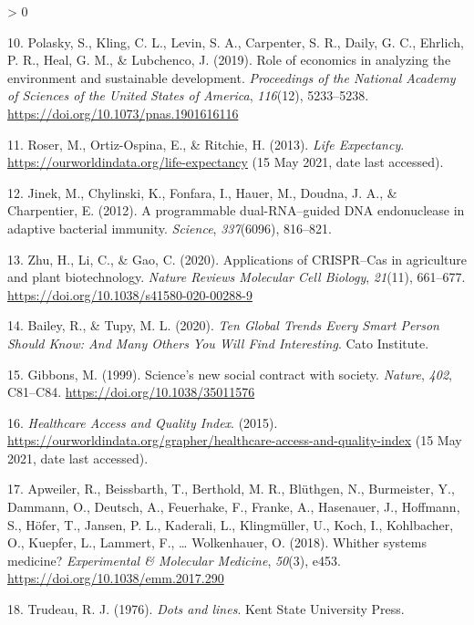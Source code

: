 \documentclass[
  12pt,
]{book}
\newlength{\cslhangindent}
\newenvironment{CSLReferences}[2] %
 {%
  \setlength{\parindent}{0pt}
  \ifodd #1 \everypar{\setlength{\hangindent}{\cslhangindent}}\ignorespaces\fi
  \ifnum #2 > 0
  \setlength{\parskip}{#2\baselineskip}
  \fi
 }%
 {}
\begin{document}
\begin{CSLReferences}{1}{0}
\leavevmode\hypertarget{ref-Polasky2019}{}%
10. Polasky, S., Kling, C. L., Levin, S. A., Carpenter, S. R., Daily, G. C., Ehrlich, P. R., Heal, G. M., \& Lubchenco, J. (2019). {Role of economics in analyzing the environment and sustainable development}. \emph{Proceedings of the National Academy of Sciences of the United States of America}, \emph{116}(12), 5233--5238. \url{https://doi.org/10.1073/pnas.1901616116}

\leavevmode\hypertarget{ref-Roser2013}{}%
11. Roser, M., Ortiz-Ospina, E., \& Ritchie, H. (2013). \emph{{Life Expectancy}}. \url{https://ourworldindata.org/life-expectancy} (15 May 2021, date last accessed).

\leavevmode\hypertarget{ref-Jinek2012}{}%
12. Jinek, M., Chylinski, K., Fonfara, I., Hauer, M., Doudna, J. A., \& Charpentier, E. (2012). {A programmable dual-RNA--guided DNA endonuclease in adaptive bacterial immunity}. \emph{Science}, \emph{337}(6096), 816--821.

\leavevmode\hypertarget{ref-Zhu2020}{}%
13. Zhu, H., Li, C., \& Gao, C. (2020). {Applications of CRISPR--Cas in agriculture and plant biotechnology}. \emph{Nature Reviews Molecular Cell Biology}, \emph{21}(11), 661--677. \url{https://doi.org/10.1038/s41580-020-00288-9}

\leavevmode\hypertarget{ref-Bailey2020}{}%
14. Bailey, R., \& Tupy, M. L. (2020). \emph{{Ten Global Trends Every Smart Person Should Know: And Many Others You Will Find Interesting}}. Cato Institute.

\leavevmode\hypertarget{ref-Gibbons1999}{}%
15. Gibbons, M. (1999). {Science's new social contract with society}. \emph{Nature}, \emph{402}, C81--C84. \url{https://doi.org/10.1038/35011576}

\leavevmode\hypertarget{ref-HAQ2015}{}%
16. \emph{{Healthcare Access and Quality Index}}. (2015). \url{https://ourworldindata.org/grapher/healthcare-access-and-quality-index} (15 May 2021, date last accessed).

\leavevmode\hypertarget{ref-Apweiler2018}{}%
17. Apweiler, R., Beissbarth, T., Berthold, M. R., Blüthgen, N., Burmeister, Y., Dammann, O., Deutsch, A., Feuerhake, F., Franke, A., Hasenauer, J., Hoffmann, S., Höfer, T., Jansen, P. L., Kaderali, L., Klingmüller, U., Koch, I., Kohlbacher, O., Kuepfer, L., Lammert, F., \ldots{} Wolkenhauer, O. (2018). {Whither systems medicine?} \emph{Experimental {\&} Molecular Medicine}, \emph{50}(3), e453. \url{https://doi.org/10.1038/emm.2017.290}

\leavevmode\hypertarget{ref-Trudeau1976}{}%
18. Trudeau, R. J. (1976). \emph{{Dots and lines}}. Kent State University Press.


\end{CSLReferences}
\end{document}
